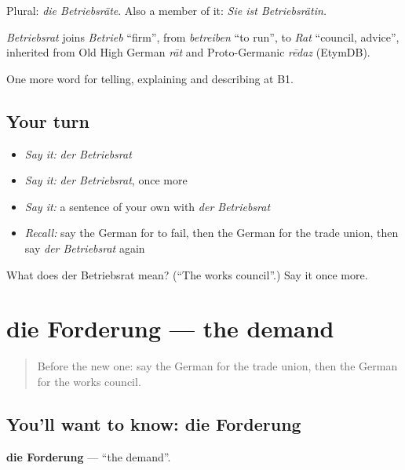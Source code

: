 Plural: \emph{die Betriebsräte}. Also a member of it: \emph{Sie ist Betriebsrätin.}

\begin{cousinweb}
\emph{Betriebsrat} joins \emph{Betrieb} \textquotedblleft{}firm\textquotedblright{}, from \emph{betreiben} \textquotedblleft{}to run\textquotedblright{}, to \emph{Rat} \textquotedblleft{}council, advice\textquotedblright{}, inherited from Old High German \emph{rāt} and Proto-Germanic \emph{rēdaz} (EtymDB).
\end{cousinweb}

\begin{grammarlens}[title={What you've built}]
One more word for telling, explaining and describing at B1.
\end{grammarlens}

\subsection*{Your turn}
\begin{itemize}
\raggedright
  \item \emph{Say it:} \emph{der Betriebsrat}
  \item \emph{Say it:} \emph{der Betriebsrat}, once more
  \item \emph{Say it:} a sentence of your own with \emph{der Betriebsrat}
  \item \emph{Recall:} say the German for to fail, then the German for the trade union, then say \emph{der Betriebsrat} again
\end{itemize}

\begin{tcolorbox}[breakable,colback=teal!4,colframe=teal!35!black,title={Before you move on}]
What does der Betriebsrat mean? (\textquotedblleft{}The works council\textquotedblright{}.) Say it once more.
\end{tcolorbox}
\section[die Forderung]{die Forderung — the demand}

\label{lesson:GE-C357-forderung}



\begin{quote}
Before the new one: say the German for the trade union, then the German for the works council.
\end{quote}

\subsection*{You'll want to know: die Forderung}
\textbf{die Forderung} — \textquotedblleft{}the demand\textquotedblright{}.

